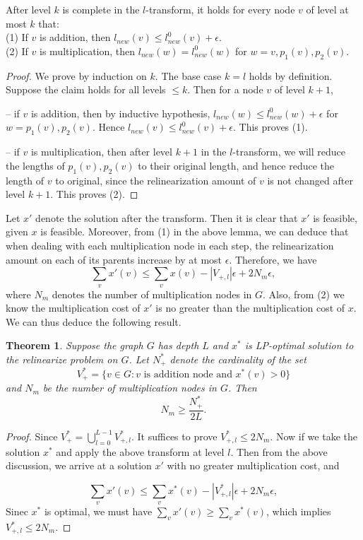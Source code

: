\documentclass[11pt]{article} %
\theoremstyle{plain}
\newtheorem{theorem}{Theorem}
\theoremstyle{definition}
\begin{document}
\begin{lemma}
After level $k$ is complete in the $l$-transform, it holds for  every node $v$ of level at most $k$ that: \\
(1) If $v$ is addition, then  $l_{new}(v)  \leq l_{new}^0(v) + \epsilon$. \\
(2) If $v$ is multiplication, then  $l_{new}(w) = l_{new}^0(w)$ for $w = v, p_1(v), p_2(v)$.  
\end{lemma}

\begin{proof}
We prove by induction on $k$. The base case $k = l$ holds by definition. Suppose the claim holds for all levels $\leq k$. Then for a node $v$ of level $k+1$, 

-- if $v$ is addition, then by inductive hypothesis, $l_{new}(w)  \leq l_{new}^0(w) + \epsilon$ for $w = p_1(v), p_2(v)$. Hence $l_{new}(v) \leq l_{new}^0(v) + \epsilon$. This proves (1). 

-- if $v$ is multiplication, then after level $k+1$ in the $l$-transform, we will reduce the lengths of $p_1(v), p_2(v)$ to their original length, and hence reduce the length of $v$ to original, since the relinearization amount of $v$ is not changed after level $k+1$. This proves (2). 
\end{proof}

Let $x'$ denote the solution after the transform. Then it is clear that $x'$ is feasible, given $x$ is feasible. 
Moreover, from (1) in the above lemma, we can deduce that when dealing with each multiplication node in each step, the relinearization amount on each of its parents increase by at most $\epsilon$. Therefore, we have 
\[ 
	\sum_{v} x'(v)  \leq \sum_{v} x(v)  -  |V_{+,l}| \epsilon + 2N_m \epsilon, 
\]
where $N_m$  denotes the number of multiplication nodes in $G$. Also, from (2) we know the multiplication cost of $x'$ is no greater than the multiplication cost of $x$. We can thus deduce the following result.

\begin{theorem}
Suppose the graph $G$ has depth $L$ and $x^*$ is LP-optimal solution to the relinearize problem on $G$. Let $N_{+}^*$ denote the cardinality of the set
\[
V_+^* = \{ v \in G: v \mbox{ is addition node and } x^*(v) > 0 \}
\]
and $N_m$ be the number of multiplication nodes in $G$.  Then 
\[
	N_m \geq \frac{N_+^*}{2L}. 
\]
\end{theorem}




\begin{proof}
Since $V_+^* = \bigcup_{l =0}^{L-1} V_{+,l}^{*}$. It suffices to prove $V_{+,l}^{*} \leq 2N_m$. Now if we take the solution $x^*$ and apply the above transform at level $l$. Then from the above discussion, we arrive at a solution $x'$ with no greater multiplication cost, and 

\[ 
	\sum_v x'(v)  \leq \sum_v x^*(v)  -  |V_{+,l}^*| \epsilon + 2N_m \epsilon, 
\]
Sinec $x^*$ is optimal, we must have $\sum_v x'(v)  \geq \sum_v x^*(v)$, which implies  $V_{+,l}^{*} \leq 2N_m$.
\end{proof}
\end{document}
